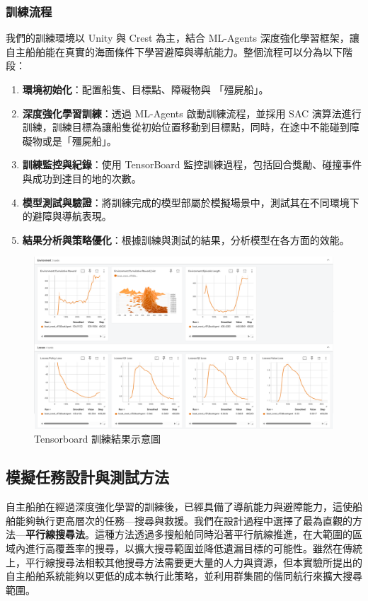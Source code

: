 \documentclass[12pt,a4paper]{article}
\begin{document}
\subsubsection{訓練流程}
我們的訓練環境以 Unity 與 Crest 為主，結合 ML-Agents 深度強化學習框架，讓自主船舶能在真實的海面條件下學習避障與導航能力。整個流程可以分為以下階段：
\begin{enumerate}
    \item \textbf{環境初始化}：配置船隻、目標點、障礙物與 「殭屍船」。
    \item \textbf{深度強化學習訓練}：透過 ML-Agents 啟動訓練流程，並採用 SAC 演算法進行訓練，訓練目標為讓船隻從初始位置移動到目標點，同時，在途中不能碰到障礙物或是「殭屍船」。
    \item \textbf{訓練監控與紀錄}：使用 TensorBoard 監控訓練過程，包括回合獎勵、碰撞事件與成功到達目的地的次數。
    \item \textbf{模型測試與驗證}：將訓練完成的模型部屬於模擬場景中，測試其在不同環境下的避障與導航表現。
    \item \textbf{結果分析與策略優化}：根據訓練與測試的結果，分析模型在各方面的效能。
\end{enumerate}

\begin{figure}[h]
    \centering
    \includegraphics[scale=0.3]{image/Tensorboard.png}
    \caption{Tensorboard 訓練結果示意圖}
\end{figure}

\subsection{模擬任務設計與測試方法}
自主船舶在經過深度強化學習的訓練後，已經具備了導航能力與避障能力，這使船舶能夠執行更高層次的任務—搜尋與救援。我們在設計過程中選擇了最為直觀的方法—\textbf{平行線搜尋法}\cite{IAMSAR2008}。這種方法透過多搜船舶同時沿著平行航線推進，在大範圍的區域內進行高覆蓋率的搜尋，以擴大搜尋範圍並降低遺漏目標的可能性。雖然在傳統上，平行線搜尋法相較其他搜尋方法需要更大量的人力與資源，但本實驗所提出的自主船舶系統能夠以更低的成本執行此策略，並利用群集間的偕同航行來擴大搜尋範圍。
\end{document}
